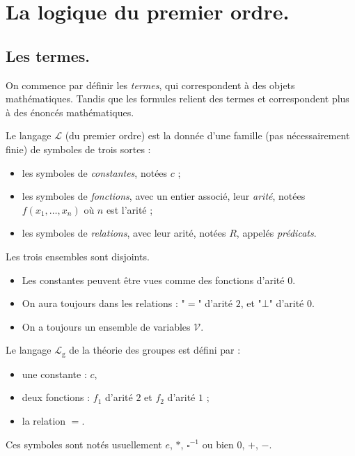 \documentclass[./main]{subfiles}
\begin{document}
  \chapter{La logique du premier ordre.}

  \section{Les termes.}

  On commence par définir les \textit{termes}, qui correspondent à des objets mathématiques.
  Tandis que les formules relient des termes et correspondent plus à des énoncés mathématiques.

  \begin{defn}
    Le langage $\mathcal{L}$ (du premier ordre)
    est la donnée d'une famille (pas nécessairement finie) de symboles de trois sortes :
    \begin{itemize}
      \item les symboles de \textit{constantes}, notées $c$ ;
      \item les symboles de \textit{fonctions}, avec un entier associé, leur \textit{arité}, notées $f(x_1, \ldots, x_n)$ où $n$ est l'arité ;
      \item les symboles de \textit{relations}, avec leur arité, notées $R$, appelés \textit{prédicats}.
    \end{itemize}
    Les trois ensembles sont disjoints.
  \end{defn}

  \begin{rmk}
    \begin{itemize}
      \item Les constantes peuvent être vues comme des fonctions d'arité $0$.
      \item On aura toujours dans les relations : "$=$" d'arité $2$, et "$\bot$" d'arité $0$.
      \item On a toujours un ensemble de variables $\mathcal{V}$.
    \end{itemize}
  \end{rmk}

  \begin{exm}
    Le langage $\mathcal{L}_\mathrm{g}$ de la théorie des groupes est défini par :
    \begin{itemize}
      \item une constante : $c$,
      \item deux fonctions : $f_1$ d'arité $2$ et $f_2$ d'arité $1$ ;
      \item la relation $=$.
    \end{itemize}
    Ces symboles sont notés usuellement $e$, $*$, $\square^{-1}$ ou bien $0$, $+$, $-$.
  \end{exm}
\end{document}
